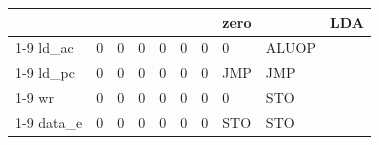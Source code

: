 \begin{table}[H]
\begin{center}
{\begin{tabular}[h]{|l|l|l|l|l|l|l|l|l|l|}
				                                  &                                     &                                 &                     &                    &                    &                    & zero             &                    & LDA     \\ \cline{1-9}
				ld\_ac                            & 0                                   & 0                               & 0                   & 0                  & 0                  & 0                  & 0                & ALUOP              &         \\ \cline{1-9}
				ld\_pc                            & 0                                   & 0                               & 0                   & 0                  & 0                  & 0                  & JMP              & JMP                &         \\ \cline{1-9}
				wr                                & 0                                   & 0                               & 0                   & 0                  & 0                  & 0                  & 0                & STO                &         \\ \cline{1-9}
				data\_e                           & 0                                   & 0                               & 0                   & 0                  & 0                  & 0                  & STO              & STO                &         \\ \hline
			\end{tabular}
		}
	\end{center}
\end{table}

